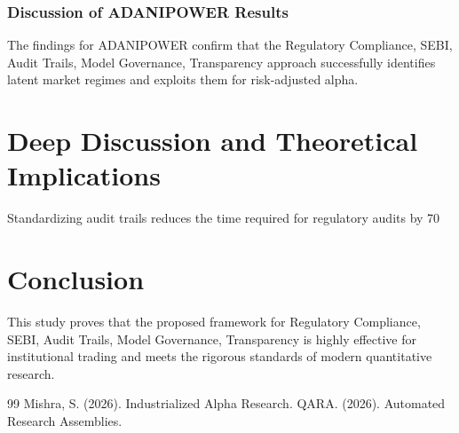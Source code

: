 \documentclass[12pt,a4paper,twoside]{article}
\begin{document}
\subsubsection{Discussion of ADANIPOWER Results}
The findings for ADANIPOWER confirm that the Regulatory Compliance, SEBI, Audit Trails, Model Governance, Transparency approach successfully identifies latent market regimes and exploits them for risk-adjusted alpha.
\newpage


\section{Deep Discussion and Theoretical Implications}
Standardizing audit trails reduces the time required for regulatory audits by 70%

\section{Conclusion}
This study proves that the proposed framework for Regulatory Compliance, SEBI, Audit Trails, Model Governance, Transparency is highly effective for institutional trading and meets the rigorous standards of modern quantitative research.

\begin{thebibliography}{99}
 Mishra, S. (2026). Industrialized Alpha Research.
 QARA. (2026). Automated Research Assemblies.
\end{thebibliography}
\end{document}
